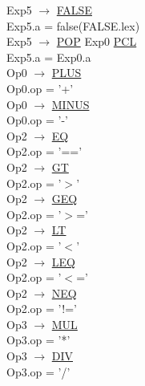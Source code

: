 \documentclass[\main/MemoriaPL.tex]{subfiles}
\begin{document}
    Exp5 $\rightarrow$ \underline{FALSE}\\
    \hspace*{5mm}Exp5.a = false(FALSE.lex)\\
    Exp5 $\rightarrow$ \underline{POP} Exp0 \underline{PCL}\\
    \hspace*{5mm}Exp5.a = Exp0.a\\
    Op0 $\rightarrow$ \underline{PLUS}\\
    \hspace*{5mm}Op0.op = '+'\\
    Op0 $\rightarrow$ \underline{MINUS}\\
    \hspace*{5mm}Op0.op = '-'\\
    Op2 $\rightarrow$ \underline{EQ}\\
    \hspace*{5mm}Op2.op = '=='\\
    Op2 $\rightarrow$ \underline{GT}\\
    \hspace*{5mm}Op2.op = '$>$'\\
    Op2 $\rightarrow$ \underline{GEQ}\\
    \hspace*{5mm}Op2.op = '$>$='\\
    Op2 $\rightarrow$ \underline{LT}\\
    \hspace*{5mm}Op2.op = '$<$'\\
    Op2 $\rightarrow$ \underline{LEQ}\\
    \hspace*{5mm}Op2.op = '$<$='\\
    Op2 $\rightarrow$ \underline{NEQ}\\
    \hspace*{5mm}Op2.op = '!='\\
    Op3 $\rightarrow$ \underline{MUL}\\
    \hspace*{5mm}Op3.op = '*'\\
    Op3 $\rightarrow$ \underline{DIV}\\
    \hspace*{5mm}Op3.op = '/'\\
\end{document}
